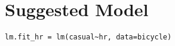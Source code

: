 \section{Suggested Model}
\label{sec:model}

\begin{lstlisting}[style=rlanguage]
lm.fit_hr = lm(casual~hr, data=bicycle)
\end{lstlisting} 